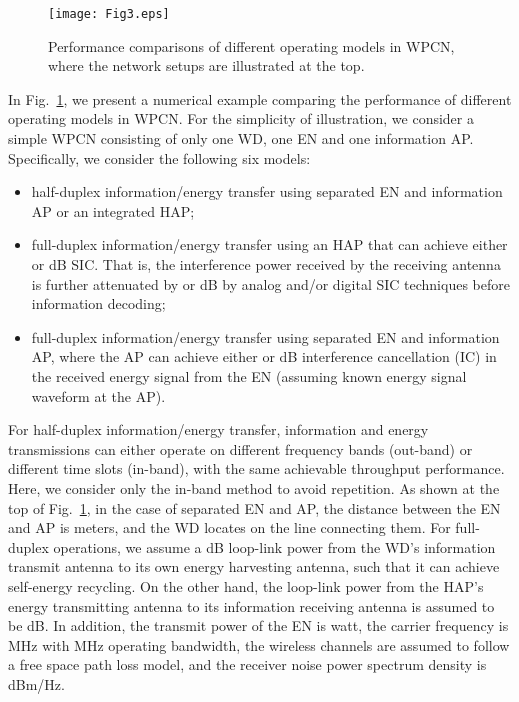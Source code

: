 \documentclass[journal, draftcls, one column, 12pt]{IEEEtran}
\begin{document}
\begin{figure}
\centering
  \begin{center}
    \texttt{[image: Fig3.eps]}
  \end{center}
  \caption{Performance comparisons of different operating models in WPCN, where the network setups are illustrated at the top.}
  \label{73}
\end{figure}

In Fig.~\ref{73}, we present a numerical example comparing the performance of different operating models in WPCN. For the simplicity of illustration, we consider a simple WPCN consisting of only one WD, one EN and one information AP. Specifically, we consider the following six models:
\begin{itemize}
  \item half-duplex information/energy transfer using separated EN and information AP or an integrated HAP;
  \item full-duplex information/energy transfer using an HAP that can achieve either  or  dB SIC. That is, the interference power received by the receiving antenna is further attenuated by  or  dB by analog and/or digital SIC techniques before information decoding;
  \item full-duplex information/energy transfer using separated EN and information AP, where the AP can achieve either  or  dB interference cancellation (IC) in the received energy signal from the EN (assuming known energy signal waveform at the AP).
\end{itemize}
For half-duplex information/energy transfer, information and energy transmissions can either operate on different frequency bands (out-band) or different time slots (in-band), with the same achievable throughput performance. Here, we consider only the in-band method to avoid repetition. As shown at the top of Fig.~\ref{73}, in the case of separated EN and AP, the distance between the EN and AP is  meters, and the WD locates on the line connecting them. For full-duplex operations, we assume a  dB loop-link power from the WD's information transmit antenna to its own energy harvesting antenna, such that it can achieve  self-energy recycling. On the other hand, the loop-link power from the HAP's energy transmitting antenna to its information receiving antenna is assumed to be  dB. In addition, the transmit power of the EN is  watt, the carrier frequency is  MHz with  MHz operating bandwidth, the wireless channels are assumed to follow a free space path loss model, and the receiver noise power spectrum density is  dBm/Hz.
\end{document}
